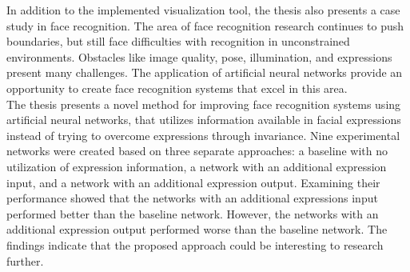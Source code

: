 \noindent In addition to the implemented visualization tool, the thesis also presents a case study in face recognition. The area of face recognition research continues to push boundaries, but still face difficulties with recognition in unconstrained environments. Obstacles like image quality, pose, illumination, and expressions present many challenges. The application of artificial neural networks provide an opportunity to create face recognition systems that excel in this area.\\

\noindent The thesis presents a novel method for improving face recognition systems using artificial neural networks, that utilizes information available in facial expressions instead of trying to overcome expressions through invariance. Nine experimental networks were created based on three separate approaches: a baseline with no utilization of expression information, a network with an additional expression input, and a network with an additional expression output. Examining their performance showed that the networks with an additional expressions input performed better than the baseline network. However, the networks with an additional expression output performed worse than the baseline network. The findings indicate that the proposed approach could be interesting to research further.

\clearpage